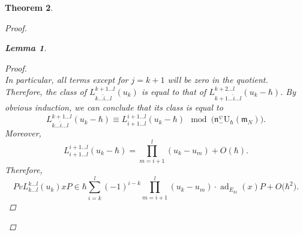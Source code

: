 \documentclass[10pt,a4paper]{amsart}
\numberwithin{equation}{section}
\newtheorem{Theorem}{Theorem}[section]
\newtheorem{Lemma}[Theorem]{Lemma}
\newcommand{\U}{\mathrm{U}_{\hbar}}
\newcommand{\n}{\mathfrak{n}}
\newcommand{\m}{\mathfrak{m}}
\DeclareMathOperator{\ad}{ad}
\begin{document}
\begin{Theorem}
\begin{proof}
\begin{Lemma}
\begin{proof}
\[					\]
					In particular, all terms except for $j=k+1$ will be zero in the quotient. Therefore, the class of $L_{k \dots \hat{i} \dots l}^{k+1 \dots l}(u_k)$ is equal to that of $L_{k+1\dots \hat{i} \dots l}^{k+2 \dots l}(u_k-\hbar)$. By obvious induction, we can conclude that its class is equal to
					\begin{equation}
						\label{eq::class_quot}
						L_{k \dots \hat{i} \dots l}^{k+1 \dots l}(u_k-\hbar) \equiv L_{i+1\dots l}^{i+1\dots l}(u_k-\hbar) \mod\bigl(\n_-^{\psi} \U(\m_N)\bigr).
					\end{equation}
					Moreover,
					\[
					L_{i+1\dots l}^{i+1\dots l}(u_k-\hbar) = \prod\limits_{m=i+1}^l (u_k - u_m) + O(\hbar).
					\]
					Therefore,
					\begin{equation}
						\label{eq::action_minor}
						Pv L_{k\dots l}^{k \dots l}(u_k) x P \in \hbar \sum\limits_{i=k}^l (-1)^{i-k} \prod_{m=i+1}^l (u_k - u_m) \cdot \ad_{E_{ki}}(x) P + O\bigl(\hbar^2\bigr).
					\end{equation}
					

\end{proof}
\end{Lemma}
\end{proof}
\end{Theorem}
\end{document}

